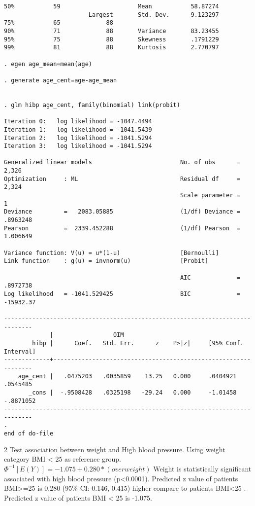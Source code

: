 \documentclass{article}
\begin{document}
\begin{verbatim}
50%           59                      Mean           58.87274
                        Largest       Std. Dev.      9.123297
75%           65             88
90%           71             88       Variance       83.23455
95%           75             88       Skewness       .1791229
99%           81             88       Kurtosis       2.770797

. egen age_mean=mean(age)

. generate age_cent=age-age_mean


. glm hibp age_cent, family(binomial) link(probit)

Iteration 0:   log likelihood = -1047.4494  
Iteration 1:   log likelihood = -1041.5439  
Iteration 2:   log likelihood = -1041.5294  
Iteration 3:   log likelihood = -1041.5294  

Generalized linear models                         No. of obs      =      2,326
Optimization     : ML                             Residual df     =      2,324
                                                  Scale parameter =          1
Deviance         =   2083.05885                   (1/df) Deviance =   .8963248
Pearson          =  2339.452288                   (1/df) Pearson  =   1.006649

Variance function: V(u) = u*(1-u)                 [Bernoulli]
Link function    : g(u) = invnorm(u)              [Probit]

                                                  AIC             =   .8972738
Log likelihood   = -1041.529425                   BIC             =  -15932.37

------------------------------------------------------------------------------
             |                 OIM
        hibp |      Coef.   Std. Err.      z    P>|z|     [95% Conf. Interval]
-------------+----------------------------------------------------------------
    age_cent |   .0475203   .0035859    13.25   0.000     .0404921    .0545485
       _cons |  -.9508428   .0325198   -29.24   0.000     -1.01458   -.8871052
------------------------------------------------------------------------------
. 
end of do-file

\end{verbatim}

2 Test association between weight and High blood pressure. Using weight category BMI < 25 as reference group.  \\
$\Phi^{-1}[E(Y)]=-1.075+0.280*(overweight)$
Weight is statistically significant associated with high blood pressure (p<0.0001). Predicted z value of patients BMI>=25 is 0.280 (95\% CI: 0.146, 0.415) higher compare to patients BMI<25 . Predicted z value of patients BMI < 25 is -1.075.
\end{document}
